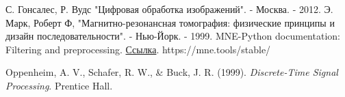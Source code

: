 
\begin{thebibliography}{9}
  С. Гонсалес, Р. Вудс "Цифровая обработка изображений". - Москва. - 2012.
 Э. Марк, Роберт Ф, "Магнитно-резонансная томография: физические принципы и дизайн последовательности". - Нью-Йорк. - 1999.
 MNE-Python documentation: Filtering and preprocessing. \href{https://mne.tools/stable/}{Ссылка}.
\newline
https://mne.tools/stable/

 Oppenheim, A. V., Schafer, R. W., \& Buck, J. R. (1999). \textit{Discrete-Time Signal Processing}. Prentice Hall.
\end{thebibliography}
\endinput